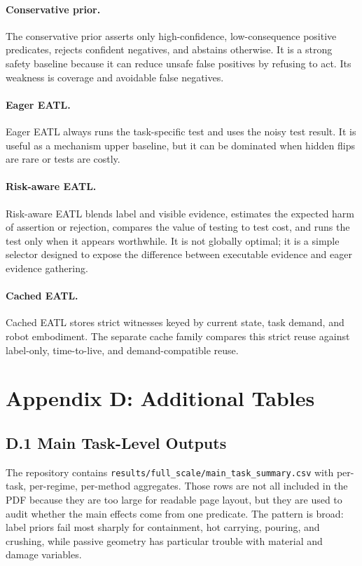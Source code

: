 \documentclass{article}
\begin{document}
\paragraph{Conservative prior.}
The conservative prior asserts only high-confidence, low-consequence positive
predicates, rejects confident negatives, and abstains otherwise.  It is a strong
safety baseline because it can reduce unsafe false positives by refusing to act.
Its weakness is coverage and avoidable false negatives.

\paragraph{Eager EATL.}
Eager EATL always runs the task-specific test and uses the noisy test result.
It is useful as a mechanism upper baseline, but it can be dominated when hidden
flips are rare or tests are costly.

\paragraph{Risk-aware EATL.}
Risk-aware EATL blends label and visible evidence, estimates the expected harm
of assertion or rejection, compares the value of testing to test cost, and runs
the test only when it appears worthwhile.  It is not globally optimal; it is a
simple selector designed to expose the difference between executable evidence
and eager evidence gathering.

\paragraph{Cached EATL.}
Cached EATL stores strict witnesses keyed by current state, task demand, and
robot embodiment.  The separate cache family compares this strict reuse against
label-only, time-to-live, and demand-compatible reuse.

\section{Appendix D: Additional Tables}

\subsection{D.1 Main Task-Level Outputs}

The repository contains \texttt{results/full\_scale/main\_task\_summary.csv}
with per-task, per-regime, per-method aggregates.  Those rows are not all
included in the PDF because they are too large for readable page layout, but
they are used to audit whether the main effects come from one predicate.  The
pattern is broad: label priors fail most sharply for containment, hot carrying,
pouring, and crushing, while passive geometry has particular trouble with
material and damage variables.
\end{document}
